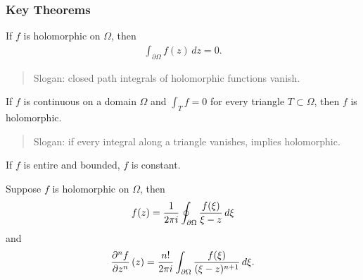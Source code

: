 \hypertarget{key-theorems}{%
\subsubsection{Key Theorems}\label{key-theorems}}

\begin{theorem}

If \(f\) is holomorphic on \(\Omega\), then
\begin{align*}  
\int_{{{\partial}}\Omega} f(z) \, dz = 0
.\end{align*}

\begin{quote}
Slogan: closed path integrals of holomorphic functions vanish.
\end{quote}

\end{theorem}

\begin{theorem}

If \(f\) is continuous on a domain \(\Omega\) and \(\int_T f = 0\) for
every triangle \(T\subset \Omega\), then \(f\) is holomorphic.

\begin{quote}
Slogan: if every integral along a triangle vanishes, implies
holomorphic.
\end{quote}

\end{theorem}

\begin{theorem}

If \(f\) is entire and bounded, \(f\) is constant.

\end{theorem}

\begin{theorem}

Suppose \(f\) is holomorphic on \(\Omega\), then
\begin{align*}
f(z) = {1 \over 2\pi i} \oint_{{{\partial}}\Omega} {f(\xi) \over \xi-z}\,d\xi
\end{align*}
and
\begin{align*}
{\frac{\partial ^nf }{\partial z^n}\,}(z) = {n! \over 2\pi i} \int_{{{\partial}}\Omega} {f(\xi) \over (\xi - z)^{n+1}} \,d\xi
.\end{align*}

\end{theorem}

